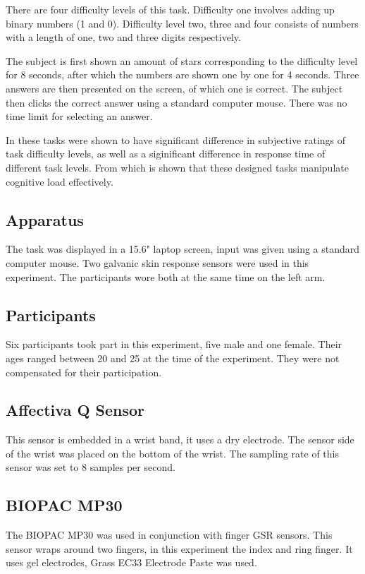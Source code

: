 \documentclass[12pt,leqno,letterpaper]{report} %
\begin{document}
There are four difficulty levels of this task. Difficulty one involves adding up binary numbers (1 and 0). Difficulty level two, three and four consists of numbers with a length of one, two and three digits respectively.

The subject is first shown an amount of stars corresponding to the difficulty level for 8 seconds, after which the numbers are shown one by one for 4 seconds. Three answers are then presented on the screen, of which one is correct. The subject then clicks the correct answer using a standard computer mouse. There was no time limit for selecting an answer.

In \citep{Nourbakhsh2013} these tasks were shown to have significant difference in subjective ratings of task difficulty levels, as well as a siginificant difference in response time of different task levels. From which is shown that these designed tasks manipulate cognitive load effectively.


\subsection{Apparatus}
The task was displayed in a 15.6" laptop screen, input was given using a standard computer mouse.
Two galvanic skin response sensors were used in this experiment. The participants wore both at the same time on the left arm.

\subsection{Participants}
Six participants took part in this experiment, five male and one female. Their ages ranged between 20 and 25 at the time of the experiment. They were not compensated for their participation.


\subsection{Affectiva Q Sensor}
This sensor is embedded in a wrist band, it uses a dry electrode. The sensor side of the wrist was placed on the bottom of the wrist. The sampling rate of this sensor was set to 8 samples per second.

\subsection{BIOPAC MP30}
The BIOPAC MP30 was used in conjunction with finger GSR sensors. This sensor wraps around two fingers, in this experiment the index and ring finger. It uses gel electrodes, Grass EC33 Electrode Paste was used.
\end{document}
